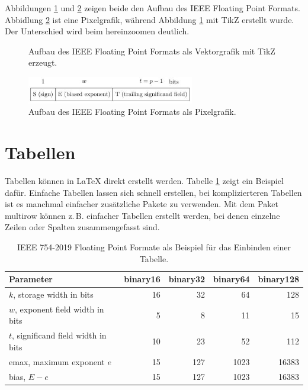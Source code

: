 Abbildungen \ref{fig:ieee_float_format_vector} und \ref{fig:ieee_float_format_pixel} zeigen beide den Aufbau des IEEE Floating Point Formats. Abbidlung \ref{fig:ieee_float_format_pixel} ist eine Pixelgrafik, während Abbildung \ref{fig:ieee_float_format_vector} mit TikZ erstellt wurde. Der Unterschied wird beim hereinzoomen deutlich.

\begin{figure}[ht]
\centering

\caption{Aufbau des IEEE Floating Point Formats als Vektorgrafik mit TikZ erzeugt.}
\label{fig:ieee_float_format_vector}
\end{figure}

\begin{figure}[ht]
\centering
\includegraphics[width=0.65\textwidth]{figures/ieee_float_format.jpg}
\caption{Aufbau des IEEE Floating Point Formats als Pixelgrafik.}
\label{fig:ieee_float_format_pixel}
\end{figure}

\section{Tabellen}
Tabellen können in \LaTeX{} direkt erstellt werden. Tabelle \ref{tab:ieee_formats} zeigt ein Beispiel dafür. Einfache Tabellen lassen sich schnell erstellen, bei komplizierteren Tabellen ist es manchmal einfacher zusätzliche Pakete zu verwenden. Mit dem Paket multirow können z.\,B. einfacher Tabellen erstellt werden, bei denen einzelne Zeilen oder Spalten zusammengefasst sind.

\begin{table}[ht]
\centering
\begin{tabular}{|l|r|r|r|r|} 
 \hline
 Parameter & binary16 & binary32 & binary64 & binary128 \\
 \hline
  $k$, storage width in bits           & 16 &  32 &   64 &   128 \\ 
  $w$, exponent field width in bits    &  5 &   8 &   11 &    15 \\
  $t$, significand field width in bits & 10 &  23 &   52 &   112 \\
  emax, maximum exponent $e$           & 15 & 127 & 1023 & 16383 \\
  bias, $E-e$                          & 15 & 127 & 1023 & 16383 \\
 \hline
\end{tabular}
\caption{IEEE 754-2019 Floating Point Formate als Beispiel für das Einbinden einer Tabelle.}
\label{tab:ieee_formats}
\end{table}

